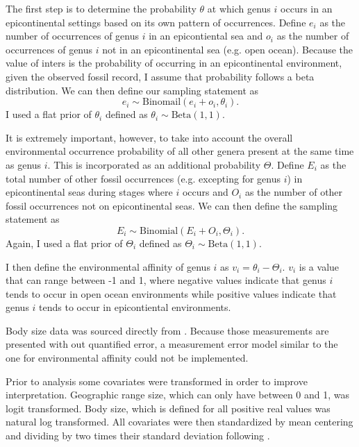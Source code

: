 \documentclass[12pt,letterpaper]{article}
\begin{document}
The first step is to determine the probability \(\theta\) at which genus \(i\) occurs in an epicontinental settings based on its own pattern of occurrences. Define \(e_{i}\) as the number of occurrences of genus \(i\) in an epicontiental sea and \(o_{i}\) as the number of occurrences of genus \(i\) not in an epicontinental sea (e.g. open ocean). Because the value of inters is the probability of occurring in an epicontinental environment, given the observed fossil record, I assume that probability follows a beta distribution. We can then define our sampling statement as
\begin{equation}
  e_{i} \sim \mathrm{Binomail}(e_{i} + o_{i}, \theta_{i}).
  \label{eq:epi_lik}
\end{equation}
I used a flat prior of \(\theta_{i}\) defined as \(\theta_{i} \sim \mathrm{Beta}(1, 1)\).

It is extremely important, however, to take into account the overall environmental occurrence probability of all other genera present at the same time as genus \(i\). This is incorporated as an additional probability \(\Theta\). Define \(E_{i}\) as the total number of other fossil occurrences (e.g. excepting for genus \(i\)) in epicontinental seas during stages where \(i\) occurs and \(O_{i}\) as the number of other fossil occurrences not on epicontinental seas. We can then define the sampling statement as
\begin{equation}
  E_{i} \sim \mathrm{Binomial}(E_{i} + O_{i}, \Theta_{i}).
  \label{eq:bck_lik}
\end{equation}
Again, I used a flat prior of \(\Theta_{i}\) defined as \(\Theta_{i} \sim \mathrm{Beta}(1, 1)\).

I then define the environmental affinity of genus \(i\) as \(v_{i} = \theta_{i} - \Theta_{i}\). \(v_{i}\) is a value that can range between -1 and 1, where negative values indicate that genus \(i\) tends to occur in open ocean environments while positive values indicate that genus \(i\) tends to occur in epicontiental environments.

Body size data was sourced directly from \citet{Payne2014}. Because those measurements are presented with out quantified error, a measurement error model similar to the one for environmental affinity could not be implemented.

Prior to analysis some covariates were transformed in order to improve interpretation. Geographic range size, which can only have between 0 and 1, was logit transformed. Body size, which is defined for all positive real values was natural log transformed. All covariates were then standardized by mean centering and dividing by two times their standard deviation following \citet{Gelman2007}.
\end{document}
